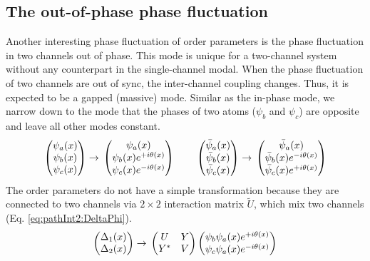 \subsection{The out-of-phase phase fluctuation}
Another interesting phase fluctuation of order parameters is the  phase fluctuation in two channels out of phase.  This mode is unique for a two-channel system without any counterpart in the single-channel modal.  When  the phase fluctuation of two channels are out of  sync,  the inter-channel coupling changes.  Thus, it is  expected to be  a gapped (massive) mode.  Similar as the in-phase mode,  we narrow down to the mode that the phases of two atoms  ($\psi_{b}$ and $\psi_{c}$) are opposite and leave all other modes constant.  
\begin{equation*}
\begin{pmatrix}\psi_{a}(x)\\\psi_{b}(x)\\\psi_{c}(x)\end{pmatrix}\rightarrow{}
	\begin{pmatrix}\psi_{a}(x)\\\psi_{b}(x)e^{+i\theta(x)}\\\psi_{c}(x)e^{-i\theta(x)}\end{pmatrix}
\qquad{}
\begin{pmatrix}\bar\psi_{a}(x)\\\bar\psi_{b}(x)\\\bar\psi_{c}(x)\end{pmatrix}\rightarrow{}
	\begin{pmatrix}\bar\psi_{a}(x)\\\bar\psi_{b}(x)e^{-i\theta(x)}\\\bar\psi_{c}(x)e^{+i\theta(x)}\end{pmatrix}
\end{equation*}
The order parameters do not have a simple transformation because they are connected to two channels via $2\times2$ interaction matrix $\tilde{U}$, which mix two channels (Eq. \ref{eq:pathInt2:DeltaPhi}).  
\begin{equation*}
\begin{pmatrix}\Delta_{1}(x)\\\Delta_{2}(x)\end{pmatrix}\rightarrow{}
	\begin{pmatrix}U&Y\\Y^{*}&V\end{pmatrix}\begin{pmatrix}\psi_{b}\psi_{a}(x)e^{+i\theta(x)}\\\psi_{c}\psi_{a}(x)e^{-i\theta(x)}\end{pmatrix}
\end{equation*}
